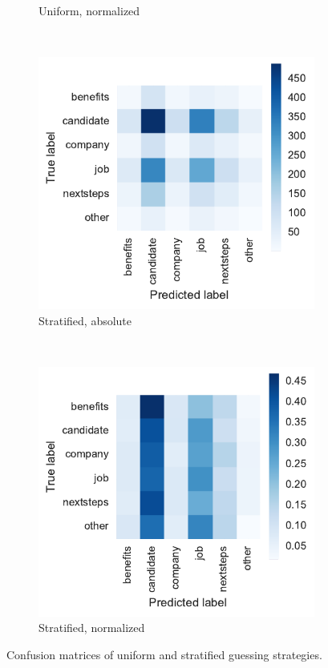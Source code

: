 \begin{figure}[h!]
\begin{subfigure}[b]{0.48\textwidth}
        \caption{Uniform, normalized}
\label{fig:guessing-conf-matrix-uniform-normalized}
    \end{subfigure}
~\begin{subfigure}[b]{0.47\textwidth}
        \includegraphics[width=\textwidth]{img/exp-vector-space/guessing-conf-matrix-stratified.pdf}
        \caption{Stratified, absolute}
\label{fig:guessing-conf-matrix-stratified}
    \end{subfigure}
~\begin{subfigure}[b]{0.48\textwidth}
        \includegraphics[width=\textwidth]{img/exp-vector-space/guessing-conf-matrix-stratified-normalized.pdf}
        \caption{Stratified, normalized}
\label{fig:guessing-stratified-normalized}
    \end{subfigure}
    \caption{Confusion matrices of uniform and stratified guessing strategies.}
\label{fig:guessing-conf-matrix}
\end{figure}

